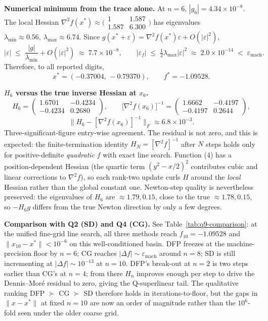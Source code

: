\documentclass[11pt,a4paper]{article}
\begin{document}
\textbf{Numerical minimum from the trace alone.}
At \(n=6\), \(|g_6|=4.34\times 10^{-8}\). The local Hessian \(\nabla^{2}f(x^{\ast})\approx\bigl(\begin{smallmatrix}1 & 1.587\\ 1.587 & 6.300\end{smallmatrix}\bigr)\) has eigenvalues \(\lambda_{\min}\approx 0.56,\ \lambda_{\max}\approx 6.74\). Since \(g(x^{\ast}+\varepsilon)=\nabla^{2}f(x^{\ast})\varepsilon+O(|\varepsilon|^{2})\),
\[
|\varepsilon| \;\le\; \frac{|g|}{\lambda_{\min}}+O(|\varepsilon|^{2})\;\approx\;7.7\times 10^{-8},
\qquad
|\varepsilon_{f}| \;\le\; \tfrac12\lambda_{\max}|\varepsilon|^{2}\;\approx\;2.0\times 10^{-14}\;<\;\varepsilon_{\text{mach}}.
\]
Therefore, to all reported digits,
\[
\boxed{\;x^{\ast}=(-0.37004,\,-0.79370),\qquad f^{\ast}=-1.09528.\;}
\]

\textbf{\(H_6\) versus the true inverse Hessian at \(x_6\).}
\[
H_6 = \begin{pmatrix} 1.6701 & -0.4234\\ -0.4234 & 0.2680 \end{pmatrix},\qquad
\bigl[\nabla^{2}f(x_6)\bigr]^{-1} = \begin{pmatrix} 1.6662 & -0.4197\\ -0.4197 & 0.2644 \end{pmatrix},
\]
\[
\bigl\|H_6-[\nabla^{2}f(x_6)]^{-1}\bigr\|_{F} \approx 6.8\times 10^{-3}.
\]
Three-significant-figure entry-wise agreement. The residual is not zero, and this is expected: the finite-termination identity \(H_{N}=[\nabla^{2}f]^{-1}\) after \(N\) steps holds only for positive-definite \emph{quadratic} \(f\) with exact line search. Function (4) has a position-dependent Hessian (the quartic term \((y^{2}-x/2)^{2}\) contributes cubic and linear corrections to \(\nabla^{2}f\)), so each rank-two update curls \(H\) around the \emph{local} Hessian rather than the global constant one. Newton-step quality is nevertheless preserved: the eigenvalues of \(H_6\) are \(\approx 1.79,0.15\), close to the true \(\approx 1.78,0.15\), so \(-H_6 g\) differs from the true Newton direction by only a few degrees.

\textbf{Comparison with Q2 (SD) and Q4 (CG).}
See Table~\ref{tab:q9-comparison}: at the unified fine-grid line search, all three methods reach \(f_{10}=-1.09528\) and \(\|x_{10}-x^{\ast}\|<10^{-6}\) on this well-conditioned basin. DFP freezes at the machine-precision floor by \(n=6\); CG reaches \(|\Delta f|\sim\varepsilon_{\text{mach}}\) around \(n=8\); SD is still incrementing at \(|\Delta f|\sim 10^{-13}\) at \(n=10\). DFP's break-out at \(n=2\) is two steps earlier than CG's at \(n=4\); from there \(H_n\) improves enough per step to drive the Dennis--Mor\'e residual to zero, giving the Q-superlinear tail. The qualitative ranking DFP \(\succ\) CG \(\succ\) SD therefore holds in iterations-to-floor, but the gaps in \(\|x-x^{\ast}\|\) at fixed \(n=10\) are now an order of magnitude rather than the \(10^{6}\)-fold seen under the older coarse grid.
\end{document}
